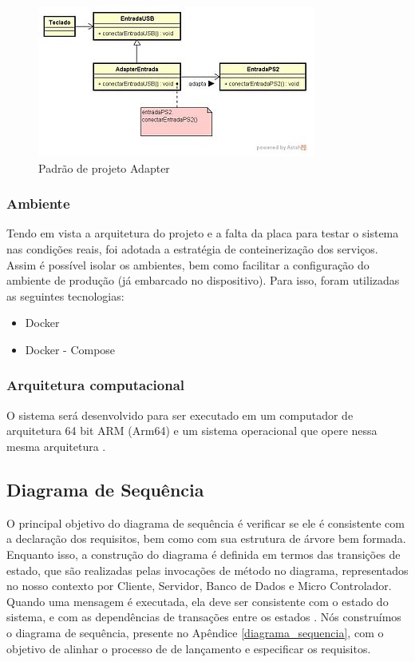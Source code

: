 \begin{figure}[!h]
	\centering
	\label{adapter}
		\includegraphics[keepaspectratio=true,scale=1]{figuras/adapter.jpg}
	\caption{Padrão de projeto Adapter \cite{Adapter}}
	\label{fig:adapter}
\end{figure}

\subsubsection{Ambiente}
Tendo em vista a arquitetura do projeto e a falta da placa para testar o sistema nas condições reais, foi adotada a estratégia de conteinerização dos serviços. Assim é possível isolar os ambientes, bem como facilitar a configuração do ambiente de produção (já embarcado no dispositivo). Para isso, foram utilizadas as seguintes tecnologias:

\begin{itemize}
    \item Docker \cite{docker}
    \item Docker - Compose \cite{docker-compose}
\end{itemize}

\subsubsection{Arquitetura computacional}
O sistema será desenvolvido para ser executado em um computador de arquitetura 64 bit ARM (Arm64) e um sistema operacional que opere nessa mesma arquitetura \cite{arquitetura_arm}.

\subsection{Diagrama de Sequência}

O principal objetivo do diagrama de sequência é verificar se ele é consistente com a declaração dos requisitos, bem como com sua estrutura de árvore bem formada. Enquanto isso, a construção do diagrama é definida em termos das transições de estado, que são realizadas pelas invocações de método no diagrama, representados no nosso contexto por Cliente, Servidor, Banco de Dados e Micro Controlador. Quando uma mensagem é executada, ela deve ser consistente com o estado do sistema, e com as dependências de transações entre os estados \cite{li2004formal}.
Nós construímos o diagrama de sequência, presente no Apêndice \ref{diagrama_sequencia}, com o objetivo de alinhar o processo de de lançamento e especificar os requisitos.

